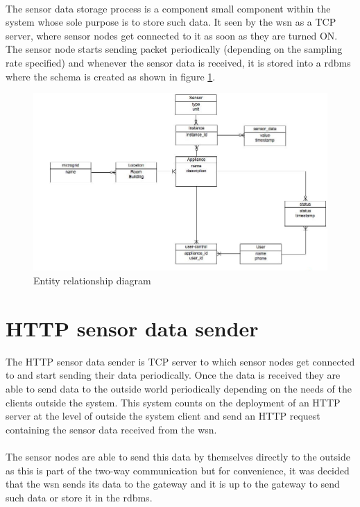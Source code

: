 \documentclass[oneside,12pt,a4paper,final]{book}
\begin{document}
\paragraph{}
The sensor data storage process is a component small component within the system whose sole purpose is to store such data. It seen by the \gls{wsn} as a TCP server, where sensor nodes get connected to it as soon as they are turned ON. The sensor node starts sending packet periodically (depending on the sampling rate specified) and whenever the sensor data is received, it is stored into a \gls{rdbms} where the schema is created as shown in figure \ref{fig:erd}.

\begin{figure}[htbp]
\centering
\includegraphics[scale=0.5]{img/smart_grid_db.jpg}
\caption{Entity relationship diagram}
\label{fig:erd}
\end{figure}

\section{HTTP sensor data sender} 
The HTTP sensor data sender is TCP server to which sensor nodes get connected to and start sending their data periodically. Once the data is received they are able to send data to the outside world periodically depending on the needs of the clients outside the system. This system counts on the deployment of an HTTP server at the level of outside the system client and send an HTTP request containing the sensor data received from the \gls{wsn}. 
\paragraph{}
The sensor nodes are able to send this data by themselves directly to the outside as this is part of the two-way communication but for convenience, it was decided that the \gls{wsn} sends its data to the gateway and it is up to the gateway to send such data or store it in the \gls{rdbms}.
\end{document}
